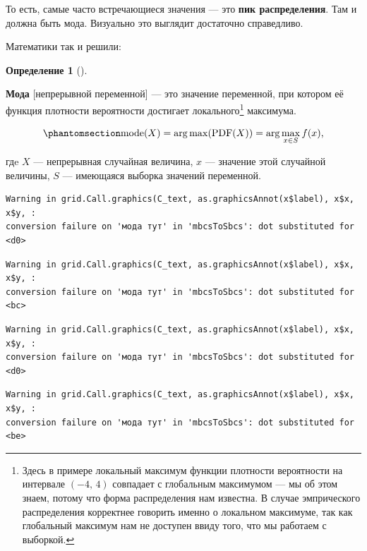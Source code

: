 \documentclass[
  letterpaper,
  DIV=11,
  numbers=noendperiod]{scrreprt}
\theoremstyle{definition}
\newtheorem{definition}{Определение}[chapter]
\theoremstyle{remark}
\begin{document}
То есть, самые часто встречающиеся значения --- это \textbf{пик
распределения}. Там и должна быть мода. Визуально это выглядит
достаточно справедливо.

Математики так и решили:

\begin{definition}[]\protect\hypertarget{def-mode-continuous}{}\label{def-mode-continuous}

\textbf{Мода} {[}непрерывной переменной{]} --- это значение переменной,
при котором её функция плотности вероятности достигает
локального\footnote{Здесь в примере локальный максимум функции плотности
  вероятности на интервале \((-4, \, 4)\) совпадает с глобальным
  максимумом --- мы об этом знаем, потому что форма распределения нам
  известна. В случае эмпрического распределения корректнее говорить
  именно о локальном максимуме, так как глобальный максимум нам не
  доступен ввиду того, что мы работаем с выборкой.} максимума.

\end{definition}

\begin{equation}\phantomsection\label{eq-mode-pdf}{
\text{mode}(X) = \arg \max(\text{PDF}(X)) = \arg \max_{x \in S}f(x),
}\end{equation}

гдe \(X\) --- непрерывная случайная величина, \(x\) --- значение этой
случайной величины, \(S\) --- имеющаяся выборка значений переменной.

\begin{verbatim}
Warning in grid.Call.graphics(C_text, as.graphicsAnnot(x$label), x$x, x$y, :
conversion failure on 'мода тут' in 'mbcsToSbcs': dot substituted for <d0>
\end{verbatim}

\begin{verbatim}
Warning in grid.Call.graphics(C_text, as.graphicsAnnot(x$label), x$x, x$y, :
conversion failure on 'мода тут' in 'mbcsToSbcs': dot substituted for <bc>
\end{verbatim}

\begin{verbatim}
Warning in grid.Call.graphics(C_text, as.graphicsAnnot(x$label), x$x, x$y, :
conversion failure on 'мода тут' in 'mbcsToSbcs': dot substituted for <d0>
\end{verbatim}

\begin{verbatim}
Warning in grid.Call.graphics(C_text, as.graphicsAnnot(x$label), x$x, x$y, :
conversion failure on 'мода тут' in 'mbcsToSbcs': dot substituted for <be>
\end{verbatim}
\end{document}
